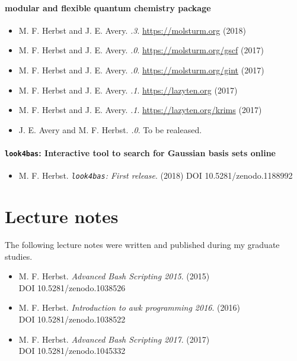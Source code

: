 \paragraph*{\molsturm modular and flexible quantum chemistry package}
\begin{itemize}
	\item M. F. Herbst and J. E. Avery.
		\textit{.3}. \url{https://molsturm.org} (2018)
	\item M. F. Herbst and J. E. Avery.
		\textit{.0}. \url{https://molsturm.org/gscf} (2017)
	\item M. F. Herbst and J. E. Avery.
		\textit{.0}. \url{https://molsturm.org/gint} (2017)
	\item M. F. Herbst and J. E. Avery.
		\textit{.1}. \url{https://lazyten.org} (2017)
	\item M. F. Herbst and J. E. Avery.
		\textit{.1}. \url{https://lazyten.org/krims} (2017)
	\item J. E. Avery and M. F. Herbst.
		\textit{.0}. To be realeased.
\end{itemize}

\pagebreak
\paragraph*{\texttt{look4bas}: Interactive tool to search for Gaussian basis sets online}
\begin{itemize}
	\item M. F. Herbst. \textit{\texttt{look4bas}: First release}. (2018) DOI \mbox{10.5281/zenodo.1188992}
\end{itemize}

\section*{Lecture notes}
{}
The following lecture notes were written and published during my graduate studies.
\begin{itemize}
	\item M. F. Herbst. \textit{Advanced Bash Scripting 2015}. (2015) \\
		DOI \mbox{10.5281/zenodo.1038526}
	\item M. F. Herbst. \textit{Introduction to awk programming 2016}. (2016) \\
		DOI \mbox{10.5281/zenodo.1038522}
	\item M. F. Herbst. \textit{Advanced Bash Scripting 2017}. (2017) \\
		DOI \mbox{10.5281/zenodo.1045332}
\end{itemize}

